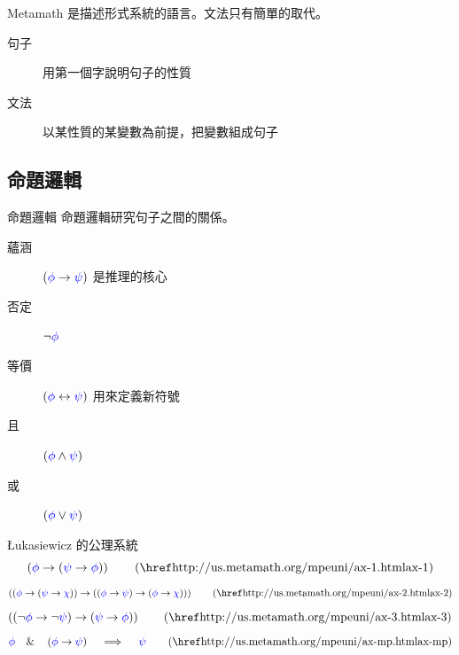 \documentclass{Slideshow}
\begin{document}
\begin{frame}{Metamath}
     是描述形式系統的語言。文法只有簡單的取代。

    \begin{description}
        \item[句子] 用第一個字說明句子的性質
        \item[文法] 以某性質的某變數為前提，把變數組成句子
    \end{description}
\end{frame}

\subsection{命題邏輯}
\newcommand{\wn}{\neg}
\newcommand{\wi}[2]{\left( #1 \to #2 \right)}
\newcommand{\wb}[2]{\left( #1 \leftrightarrow #2 \right)}
\newcommand{\wa}[2]{\left( #1 \wedge #2 \right)}
\newcommand{\wo}[2]{\left( #1 \vee #2 \right)}

\begin{frame}{命題邏輯}
    命題邏輯研究句子之間的關係。

    \begin{description}
        \item[蘊涵] $\wi\wph\wps$ 是推理的核心
        \item[否定] $\wn\wph$
        \item[等價] $\wb\wph\wps$ 用來定義新符號
        \item[且] $\wa\wph\wps$
        \item[或] $\wo\wph\wps$
    \end{description}
\end{frame}

\newcommand{\aIIi}[3]{\wi{\wi{#1}{#2}}{\wi{#1}{#3}}}

\newcommand{\axI}[2]{\wi{#1}{\wi{#2}{#1}}}
\newcommand{\axII}[3]{\wi{\wi{#1}{\wi{#2}{#3}}}{\aIIi{#1}{#2}{#3}}}
\newcommand{\axIII}[2]{\wi{\wi{\wn#1}{\wn#2}}{\wi{#2}{#1}}}

\begin{frame}{Łukasiewicz 的公理系統}
    \[ \axI\wph\wps      \tag{\mmurl{ax-1}} \]
    \[ \axII\wph\wps\wch \tag{\mmurl{ax-2}} \]
    \[ \axIII\wph\wps    \tag{\mmurl{ax-3}} \]
    \[ \wph \quad\&\quad \wi\wph\wps \quad\implies\quad \wps \tag{\mmurl{ax-mp}} \]
\end{frame}

\newcommand{\dfor}[2]{\wi{\wn#1}{#2}}
\newcommand{\dfan}[2]{\wn\wi{#1}{\wn#2}}
\newcommand{\dfbi}[2]{\dfan{\wi{#1}{#2}}{\wi{#2}{#1}}}
\end{document}
